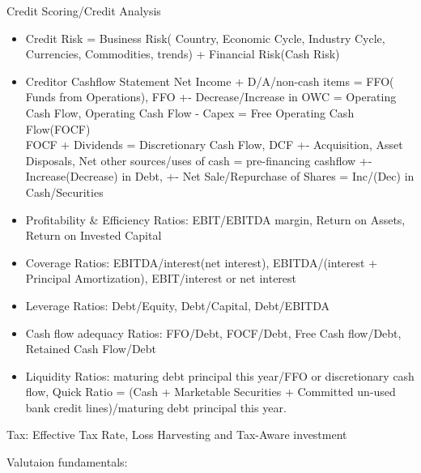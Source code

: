 \documentclass[11pt, openany]{book}              %
\begin{document}
Credit Scoring/Credit Analysis
\begin{itemize}
    \item Credit Risk = Business Risk( Country, Economic Cycle, Industry Cycle, Currencies, Commodities, trends) + Financial Risk(Cash Risk)
    \item Creditor Cashflow Statement Net Income + D/A/non-cash items = FFO( Funds from Operations), FFO +- Decrease/Increase in OWC = Operating Cash Flow, Operating Cash Flow - Capex = Free Operating Cash Flow(FOCF)\\ FOCF + Dividends = Discretionary Cash Flow, DCF +- Acquisition, Asset Disposals, Net other sources/uses of cash = pre-financing cashflow +- Increase(Decrease) in Debt, +- Net Sale/Repurchase of Shares = Inc/(Dec) in Cash/Securities
    \item Profitability \& Efficiency Ratios: EBIT/EBITDA margin, Return on Assets, Return on Invested Capital
    \item Coverage Ratios: EBITDA/interest(net interest), EBITDA/(interest + Principal Amortization), EBIT/interest or net interest
    \item Leverage Ratios: Debt/Equity, Debt/Capital, Debt/EBITDA
    \item Cash flow adequacy Ratios: FFO/Debt, FOCF/Debt, Free Cash flow/Debt, Retained Cash Flow/Debt
    \item Liquidity Ratios: maturing debt principal this year/FFO or discretionary cash flow, Quick Ratio = (Cash + Marketable Securities + Committed un-used bank credit lines)/maturing debt principal this year.
\end{itemize}

Tax:  Effective Tax Rate, Loss Harvesting and Tax-Aware investment 

Valutaion fundamentals: 
\end{document}
